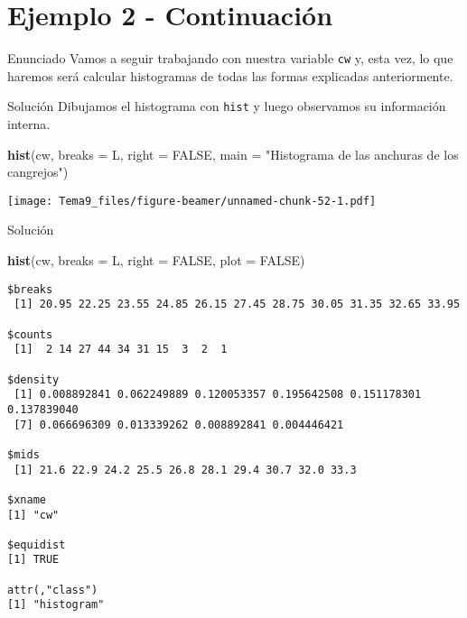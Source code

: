 \documentclass[
  ignorenonframetext,
]{beamer}
\newenvironment{Shaded}{\begin{snugshade}}{\end{snugshade}}
\newcommand{\DataTypeTok}[1]{\textcolor[rgb]{0.13,0.29,0.53}{#1}}
\newcommand{\KeywordTok}[1]{\textcolor[rgb]{0.13,0.29,0.53}{\textbf{#1}}}
\newcommand{\NormalTok}[1]{#1}
\newcommand{\OtherTok}[1]{\textcolor[rgb]{0.56,0.35,0.01}{#1}}
\newcommand{\StringTok}[1]{\textcolor[rgb]{0.31,0.60,0.02}{#1}}
\begin{document}
\hypertarget{ejemplo-2---continuaciuxf3n-1}{%
\section{Ejemplo 2 - Continuación}\label{ejemplo-2---continuaciuxf3n-1}}

\begin{frame}[fragile]{Enunciado}
\protect\hypertarget{enunciado-4}{}
Vamos a seguir trabajando con nuestra variable \texttt{cw} y, esta vez,
lo que haremos será calcular histogramas de todas las formas explicadas
anteriormente.
\end{frame}

\begin{frame}[fragile]{Solución}
\protect\hypertarget{soluciuxf3n-37}{}
Dibujamos el histograma con \texttt{hist} y luego observamos su
información interna.

\begin{Shaded}
\begin{Highlighting}[]
\KeywordTok{hist}\NormalTok{(cw, }\DataTypeTok{breaks =}\NormalTok{ L, }\DataTypeTok{right =} \OtherTok{FALSE}\NormalTok{, }\DataTypeTok{main =} \StringTok{"Histograma de las anchuras de los cangrejos"}\NormalTok{)}
\end{Highlighting}
\end{Shaded}

\texttt{[image: Tema9\_files/figure-beamer/unnamed-chunk-52-1.pdf]}
\end{frame}

\begin{frame}[fragile]{Solución}
\protect\hypertarget{soluciuxf3n-38}{}
\begin{Shaded}
\begin{Highlighting}[]
\KeywordTok{hist}\NormalTok{(cw, }\DataTypeTok{breaks =}\NormalTok{ L, }\DataTypeTok{right =} \OtherTok{FALSE}\NormalTok{, }\DataTypeTok{plot =} \OtherTok{FALSE}\NormalTok{)}
\end{Highlighting}
\end{Shaded}

\begin{verbatim}
$breaks
 [1] 20.95 22.25 23.55 24.85 26.15 27.45 28.75 30.05 31.35 32.65 33.95

$counts
 [1]  2 14 27 44 34 31 15  3  2  1

$density
 [1] 0.008892841 0.062249889 0.120053357 0.195642508 0.151178301 0.137839040
 [7] 0.066696309 0.013339262 0.008892841 0.004446421

$mids
 [1] 21.6 22.9 24.2 25.5 26.8 28.1 29.4 30.7 32.0 33.3

$xname
[1] "cw"

$equidist
[1] TRUE

attr(,"class")
[1] "histogram"
\end{verbatim}
\end{frame}
\end{document}

